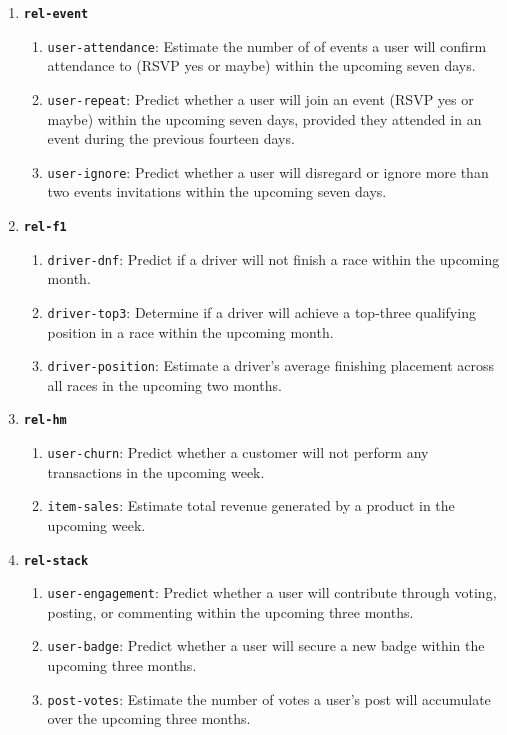 \documentclass{article} %
\begin{document}
\begin{enumerate}
\item \textbf{\texttt{rel-event}}
  \begin{enumerate}
    \item \texttt{\texttt{user-attendance}}: Estimate the number of of events a user will confirm attendance to (RSVP yes or maybe) within the upcoming seven days.
    \item \texttt{\texttt{user-repeat}}: Predict whether a user will join an event (RSVP yes or maybe) within the upcoming seven days, provided they attended in an event during the previous fourteen days.
    \item \texttt{\texttt{user-ignore}}: Predict whether a user will disregard or ignore more than two events invitations within the upcoming seven days.
  \end{enumerate}

\item \textbf{\texttt{rel-f1}}
  \begin{enumerate}
    \item \texttt{\texttt{driver-dnf}}: Predict if a driver will not finish a race within the upcoming month.
    \item \texttt{\texttt{driver-top3}}: Determine if a driver will achieve a top-three qualifying position in a race within the upcoming month.
    \item \texttt{\texttt{driver-position}}: Estimate a driver's average finishing placement across all races in the upcoming two months.
  \end{enumerate}

\item \textbf{\texttt{rel-hm}}
  \begin{enumerate}
    \item \texttt{\texttt{user-churn}}: Predict whether a customer will not perform any transactions in the upcoming week.
    \item \texttt{\texttt{item-sales}}: Estimate total revenue generated by a product in the upcoming week.
  \end{enumerate}

\item \textbf{\texttt{rel-stack}}
  \begin{enumerate}
    \item \texttt{\texttt{user-engagement}}: Predict whether a user will contribute through voting, posting, or commenting within the upcoming three months.
    \item \texttt{\texttt{user-badge}}: Predict whether a user will secure a new badge within the upcoming three months.
    \item \texttt{\texttt{post-votes}}: Estimate the number of votes a user's post will accumulate over the upcoming three months.
  \end{enumerate}


\end{enumerate}
\end{document}
